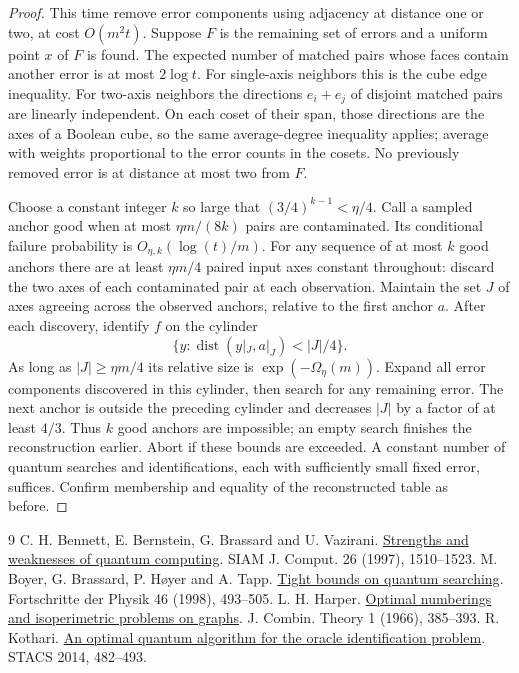 \documentclass[11pt]{article}
\newcommand{\dist}{\operatorname{dist}}
\begin{document}
\begin{proof}
This time remove error components using adjacency at distance one or two, at cost $O(m^2t)$. Suppose $F$ is the remaining set of errors and a uniform point $x$ of $F$ is found. The expected number of matched pairs whose faces contain another error is at most $2\log t$. For single-axis neighbors this is the cube edge inequality. For two-axis neighbors the directions $e_i+e_j$ of disjoint matched pairs are linearly independent. On each coset of their span, those directions are the axes of a Boolean cube, so the same average-degree inequality applies; average with weights proportional to the error counts in the cosets. No previously removed error is at distance at most two from $F$.

Choose a constant integer $k$ so large that $(3/4)^{k-1}<\eta/4$. Call a sampled anchor good when at most $\eta m/(8k)$ pairs are contaminated. Its conditional failure probability is $O_{\eta,k}(\log(t)/m)$. For any sequence of at most $k$ good anchors there are at least $\eta m/4$ paired input axes constant throughout: discard the two axes of each contaminated pair at each observation. Maintain the set $J$ of axes agreeing across the observed anchors, relative to the first anchor $a$. After each discovery, identify $f$ on the cylinder
\[
       \{y:\dist(y|_J,a|_J)<|J|/4\}.
\]
As long as $|J|\ge\eta m/4$ its relative size is $\exp(-\Omega_\eta(m))$. Expand all error components discovered in this cylinder, then search for any remaining error. The next anchor is outside the preceding cylinder and decreases $|J|$ by a factor of at least $4/3$. Thus $k$ good anchors are impossible; an empty search finishes the reconstruction earlier. Abort if these bounds are exceeded. A constant number of quantum searches and identifications, each with sufficiently small fixed error, suffices. Confirm membership and equality of the reconstructed table as before.
\end{proof}



\begin{thebibliography}{9}
 C. H. Bennett, E. Bernstein, G. Brassard and U. Vazirani.
\href{https://arxiv.org/abs/quant-ph/9701001}{Strengths and weaknesses of quantum computing}. SIAM J. Comput. 26 (1997), 1510--1523.
 M. Boyer, G. Brassard, P. H\o yer and A. Tapp.
\href{https://arxiv.org/abs/quant-ph/9605034}{Tight bounds on quantum searching}. Fortschritte der Physik 46 (1998), 493--505.
 L. H. Harper.
\href{https://doi.org/10.1016/S0021-9800(66)80059-5}{Optimal numberings and isoperimetric problems on graphs}. J. Combin. Theory 1 (1966), 385--393.
 R. Kothari.
\href{https://doi.org/10.4230/LIPIcs.STACS.2014.482}{An optimal quantum algorithm for the oracle identification problem}. STACS 2014, 482--493.
\end{thebibliography}
\end{document}
